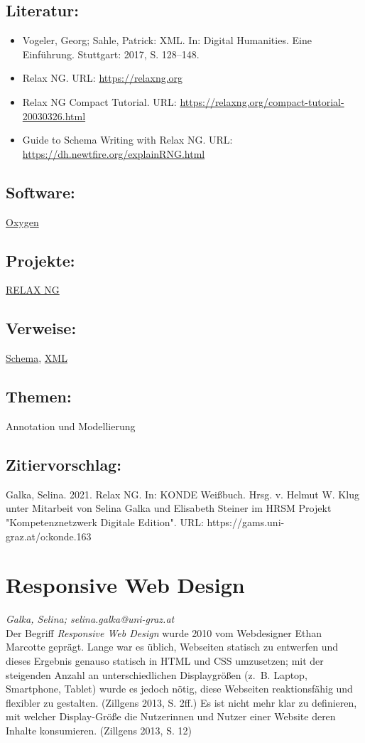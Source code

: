 \documentclass{article}
\begin{document}
        \subsection*{Literatur:}\begin{itemize}\item Vogeler, Georg; Sahle, Patrick: XML. In: Digital Humanities. Eine Einführung. Stuttgart: 2017, S. 128–148.\item Relax NG. URL: \url{https://relaxng.org}\item Relax NG Compact Tutorial. URL: \url{https://relaxng.org/compact-tutorial-20030326.html}\item Guide to Schema Writing with Relax NG. URL: \url{https://dh.newtfire.org/explainRNG.html}\end{itemize}\subsection*{Software:}\href{http://oxygenxml.com/}{Oxygen}\subsection*{Projekte:}\href{https://relaxng.org}{RELAX NG}\subsection*{Verweise:}\href{https://gams.uni-graz.at/o:konde.166}{Schema}, \href{https://gams.uni-graz.at/o:konde.215}{XML}\subsection*{Themen:}Annotation und Modellierung\subsection*{Zitiervorschlag:}Galka, Selina. 2021. Relax NG. In: KONDE Weißbuch. Hrsg. v. Helmut W. Klug unter Mitarbeit von Selina Galka und Elisabeth Steiner im HRSM Projekt "Kompetenznetzwerk Digitale Edition". URL: https://gams.uni-graz.at/o:konde.163\newpage\section*{Responsive Web Design} \emph{Galka, Selina; selina.galka@uni-graz.at }\\
        
    Der Begriff \emph{Responsive Web Design} wurde 2010 vom Webdesigner Ethan Marcotte geprägt. Lange war es üblich, Webseiten statisch zu entwerfen und dieses Ergebnis genauso statisch in HTML und CSS umzusetzen; mit der steigenden Anzahl an unterschiedlichen Displaygrößen (z. B. Laptop, Smartphone, Tablet) wurde es jedoch nötig, diese Webseiten reaktionsfähig und flexibler zu gestalten. (Zillgens 2013, S. 2ff.) Es ist nicht mehr klar zu definieren, mit welcher Display-Größe die Nutzerinnen und Nutzer einer Website deren Inhalte konsumieren. (Zillgens 2013, S. 12)\\
            
\end{document}
